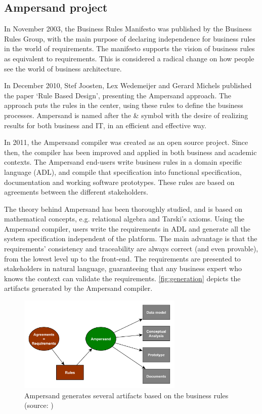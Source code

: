 
\subsection{Ampersand project}
In November 2003, the Business Rules Manifesto  was published by the Business Rules Group, with the main purpose of declaring independence for business rules in the world of requirements.
The manifesto supports the vision of business rules as equivalent to requirements.
This is considered a radical change on how people see the world of business architecture.

In December 2010, Stef Joosten, Lex Wedemeijer and Gerard Michels published the paper `Rule Based Design', presenting the Ampersand approach.
The approach puts the rules in the center, using these rules to define the business processes.
Ampersand is named after the \& symbol with the desire of realizing results for both business and IT, in an efficient and effective way.

In 2011, the Ampersand compiler was created as an open source project.
Since then, the compiler has been improved and applied in both business and academic contexts.
The Ampersand end-users write business rules in a domain specific language (ADL), and compile that specification into functional specification, documentation and working software prototypes.
%
These rules are based on agreements between the different stakeholders.

The theory behind Ampersand has been thoroughly studied, and is based on mathe\-matical concepts, e.g. relational algebra and Tarski's axioms.
Using the Ampersand compiler, users write the requirements in ADL and generate all the system specification independent of the platform.
The main advantage is that the requirements' consistency and traceability are always correct (and even provable), from the lowest level up to the front-end.
The requirements are presented to stakeholders in natural language, guaranteeing that any business expert who knows the context can validate the requirements.
\autoref{fig:generation} depicts the artifacts generated by the Ampersand compiler.
%
\begin{figure}[htb]
	\centering
	\includegraphics[width=0.7\textwidth]{Figures/Generation}
	\caption[Generated artifacts]{Ampersand generates several artifacts based on the business rules (source: \cite{ampersand-approach})}
	\label{fig:generation}
\end{figure}
%

